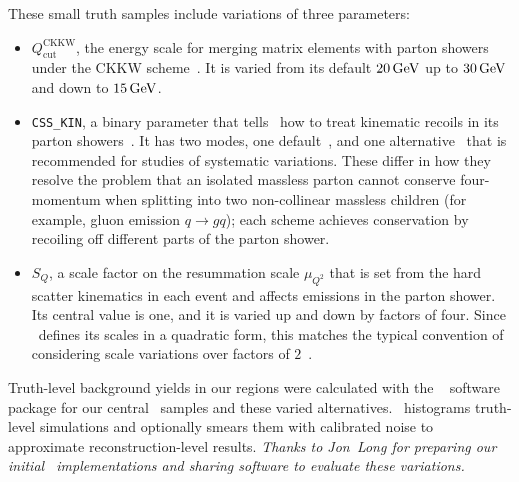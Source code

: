 These small truth samples include variations of three parameters:
\begin{itemize}
\item $Q_\textrm{cut}^\textrm{CKKW}$, the energy scale for merging
matrix elements with parton showers under the CKKW
scheme~\cite{Catani_2001_CKKW,Hoeche:2009rj}.
It is varied from its default $20\,\eV[G]$ up to $30\,\eV[G]$ and down
to $15\,\eV[G]$.
\item \texttt{CSS\_KIN}, a binary parameter that tells \sherpa\ how to treat
kinematic recoils in its parton showers~\cite{sherpa_222_manual}.
It has two modes, one default~\cite{Hoeche:2009rj}, and one
alternative~\cite{Hoeche:2009xc}
that is recommended for studies of systematic variations.
These differ in how they resolve the problem that an isolated massless parton
cannot conserve four-momentum when splitting into two non-collinear massless
children (for example, gluon emission $q\to gq$);
each scheme achieves conservation by recoiling off different parts of the
parton shower.
\item $S_Q$, a scale factor on the resummation scale $\mu_{Q^2}$ that is set
from the hard scatter kinematics in each event and affects emissions in the
parton shower.
Its central value is one, and it is varied up and down by factors of four.
Since \sherpa\ defines its scales in a quadratic form, this matches the typical
convention of considering scale variations over factors of
$2$~\cite{sherpa_222_manual,Bothmann:2019yzt}.
\end{itemize}
Truth-level background yields in our regions were calculated with the
\simpleanalysis~\cite{Lorenz:2752450,simpleanalysis_cern}
software package for
our central \diboson\ samples and these varied alternatives.
\simpleanalysis\ histograms truth-level simulations and optionally smears them
with calibrated noise to approximate reconstruction-level results.
\emph{Thanks to Jon~Long for preparing our initial
\simpleanalysis\ implementations and sharing software to evaluate these
variations.}

